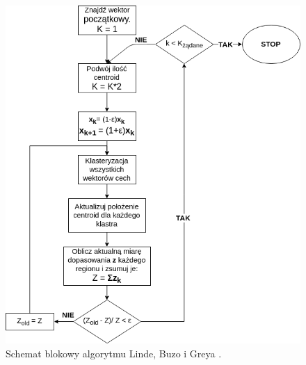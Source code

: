 \begin{figure}[ht!]
  \centering
    \includegraphics[width=1\textwidth]{lbgdiagram.png}
    
    \caption{\label{fig:lgbblock}Schemat blokowy algorytmu Linde, Buzo i Greya \cite{minidsp}.}
\end{figure}

